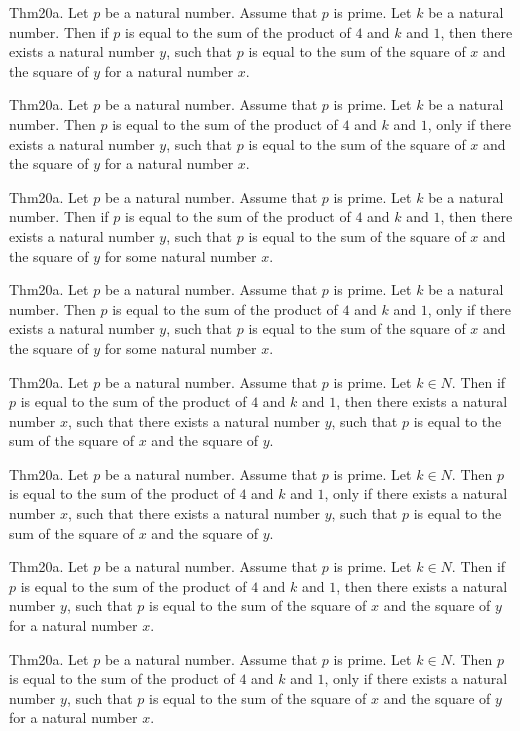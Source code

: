 \documentclass{article}
\begin{document}
Thm20a. Let $p$ be a natural number. Assume that $p$ is prime. Let $k$ be a natural number. Then if $p$ is equal to the sum of the product of $4$ and $k$ and $1$, then there exists a natural number $y$, such that $p$ is equal to the sum of the square of $x$ and the square of $y$ for a natural number $x$.

Thm20a. Let $p$ be a natural number. Assume that $p$ is prime. Let $k$ be a natural number. Then $p$ is equal to the sum of the product of $4$ and $k$ and $1$, only if there exists a natural number $y$, such that $p$ is equal to the sum of the square of $x$ and the square of $y$ for a natural number $x$.

Thm20a. Let $p$ be a natural number. Assume that $p$ is prime. Let $k$ be a natural number. Then if $p$ is equal to the sum of the product of $4$ and $k$ and $1$, then there exists a natural number $y$, such that $p$ is equal to the sum of the square of $x$ and the square of $y$ for some natural number $x$.

Thm20a. Let $p$ be a natural number. Assume that $p$ is prime. Let $k$ be a natural number. Then $p$ is equal to the sum of the product of $4$ and $k$ and $1$, only if there exists a natural number $y$, such that $p$ is equal to the sum of the square of $x$ and the square of $y$ for some natural number $x$.

Thm20a. Let $p$ be a natural number. Assume that $p$ is prime. Let $k \in N$. Then if $p$ is equal to the sum of the product of $4$ and $k$ and $1$, then there exists a natural number $x$, such that there exists a natural number $y$, such that $p$ is equal to the sum of the square of $x$ and the square of $y$.

Thm20a. Let $p$ be a natural number. Assume that $p$ is prime. Let $k \in N$. Then $p$ is equal to the sum of the product of $4$ and $k$ and $1$, only if there exists a natural number $x$, such that there exists a natural number $y$, such that $p$ is equal to the sum of the square of $x$ and the square of $y$.

Thm20a. Let $p$ be a natural number. Assume that $p$ is prime. Let $k \in N$. Then if $p$ is equal to the sum of the product of $4$ and $k$ and $1$, then there exists a natural number $y$, such that $p$ is equal to the sum of the square of $x$ and the square of $y$ for a natural number $x$.

Thm20a. Let $p$ be a natural number. Assume that $p$ is prime. Let $k \in N$. Then $p$ is equal to the sum of the product of $4$ and $k$ and $1$, only if there exists a natural number $y$, such that $p$ is equal to the sum of the square of $x$ and the square of $y$ for a natural number $x$.
\end{document}
